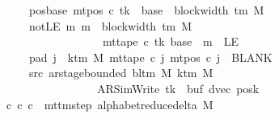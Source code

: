 \begin{isabellebody}
\ \ \ \ \ \ \ pos{\isacharunderscore}{\kern0pt}base{\isacharcolon}{\kern0pt}\ {\isachardoublequoteopen}mt{\isacharunderscore}{\kern0pt}pos\ c{\isacharprime}{\kern0pt}\ tk\ {\isacharequal}{\kern0pt}\ base\ {\isacharplus}{\kern0pt}\ block{\isacharunderscore}{\kern0pt}width\ {\isacharparenleft}{\kern0pt}{\isasymGamma}{\isacharunderscore}{\kern0pt}tm\ M{\isacharparenright}{\kern0pt}{\isachardoublequoteclose}\isanewline
\ \ \ \ \ \ \ notLE{\isacharcolon}{\kern0pt}\ {\isachardoublequoteopen}{\isasymAnd}m{\isachardot}{\kern0pt}\ m\ {\isasymle}\ block{\isacharunderscore}{\kern0pt}width\ {\isacharparenleft}{\kern0pt}{\isasymGamma}{\isacharunderscore}{\kern0pt}tm\ M{\isacharparenright}{\kern0pt}\isanewline
\ \ \ \ \ \ \ \ \ \ \ \ \ \ \ \ \ \ \ {\isasymLongrightarrow}\ mt{\isacharunderscore}{\kern0pt}tape\ c{\isacharprime}{\kern0pt}\ tk\ {\isacharparenleft}{\kern0pt}base\ {\isacharplus}{\kern0pt}\ m{\isacharparenright}{\kern0pt}\ {\isasymnoteq}\ LE{}{\isachardoublequoteclose}\isanewline
\ \ \ \ \ \ \ pad{}{\isacharcolon}{\kern0pt}\ {\isachardoublequoteopen}{\isasymforall}j\ {\isasymge}\ k{\isacharunderscore}{\kern0pt}tm\ M{\isachardot}{\kern0pt}\ mt{\isacharunderscore}{\kern0pt}tape\ c{\isacharprime}{\kern0pt}\ j\ {\isacharparenleft}{\kern0pt}mt{\isacharunderscore}{\kern0pt}pos\ c{\isacharprime}{\kern0pt}\ j{\isacharparenright}{\kern0pt}\ {\isacharequal}{\kern0pt}\ BLANK{}{\isachardoublequoteclose}\isanewline
\ \ \ \ \ \ \ src{}{\isacharcolon}{\kern0pt}\ {\isachardoublequoteopen}ar{\isacharunderscore}{\kern0pt}stage{\isacharunderscore}{\kern0pt}bounded\ {\isacharparenleft}{\kern0pt}bl{\isacharunderscore}{\kern0pt}tm\ M{\isacharparenright}{\kern0pt}\ {\isacharparenleft}{\kern0pt}k{\isacharunderscore}{\kern0pt}tm\ M{\isacharparenright}{\kern0pt}\isanewline
\ \ \ \ \ \ \ \ \ \ \ \ \ \ \ \ \ \ \ {\isacharparenleft}{\kern0pt}AR{\isacharunderscore}{\kern0pt}SimWrite{\isacharcomma}{\kern0pt}\ tk{\isacharcomma}{\kern0pt}\ {}{\isacharcomma}{\kern0pt}\ buf{\isacharcomma}{\kern0pt}\ dvec{\isacharcomma}{\kern0pt}\ posk{\isacharparenright}{\kern0pt}{\isachardoublequoteclose}\isanewline
\ \ \ {\isachardoublequoteopen}{\isasymexists}c{}{\isachardot}{\kern0pt}\ {\isacharparenleft}{\kern0pt}c{\isacharprime}{\kern0pt}{\isacharcomma}{\kern0pt}\ c{}{\isacharparenright}{\kern0pt}\ {\isasymin}\ {\isacharparenleft}{\kern0pt}mttm{\isacharunderscore}{\kern0pt}step\ {\isacharparenleft}{\kern0pt}alphabet{\isacharunderscore}{\kern0pt}reduce{\isacharunderscore}{\kern0pt}delta\ M{\isacharparenright}{\kern0pt}{\isacharparenright}{\kern0pt}\isanewline

\end{isabellebody}
